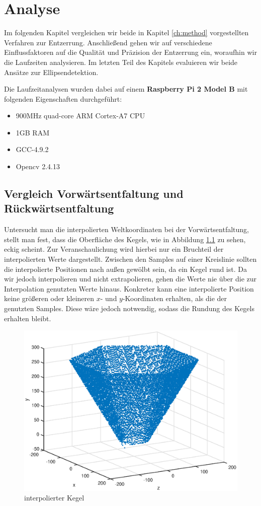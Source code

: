 \chapter{Analyse}
\label{ch:analysis}

Im folgenden Kapitel vergleichen wir beide in Kapitel \ref{ch:method} vorgestellten Verfahren zur Entzerrung. Anschließend gehen wir auf verschiedene Einflussfaktoren auf die Qualität und Präzision der Entzerrung ein, woraufhin wir die Laufzeiten analysieren. Im letzten Teil des Kapitels evaluieren wir beide Ansätze zur Ellipsendetektion.


Die Laufzeitanalysen wurden dabei auf einem \textbf{Raspberry Pi 2 Model B} mit folgenden Eigenschaften durchgeführt:
\begin{itemize}
	\item 900MHz quad-core ARM Cortex-A7 CPU
	\item 1GB RAM
	\item GCC-4.9.2
	\item Opencv 2.4.13
\end{itemize}


\section{Vergleich Vorwärtsentfaltung und Rückwärtsentfaltung}
Untersucht man die interpolierten Weltkoordinaten bei der Vorwärtsentfaltung, stellt man fest, dass die Oberfläche des Kegels,  wie in Abbildung \ref{fig:3DInterpol} zu sehen, eckig scheint. Zur Veranschaulichung wird hierbei nur ein Bruchteil der interpolierten Werte dargestellt. Zwischen den Samples auf einer Kreislinie sollten die interpolierte Positionen nach außen gewölbt sein, da ein Kegel rund ist. Da wir jedoch interpolieren und nicht extrapolieren, gehen die Werte nie über die zur Interpolation genutzten Werte hinaus. Konkreter kann eine interpolierte Position keine größeren oder kleineren $x$- und $y$-Koordinaten erhalten, als die der genutzten Samples. Diese wäre jedoch notwendig, sodass die Rundung des Kegels erhalten bleibt.

\begin{figure}[!htb]
	\centering
	\includegraphics[scale=.7]{images/3d_interpol.eps}
	\caption{interpolierter Kegel}
	\label{fig:3DInterpol}
\end{figure}

